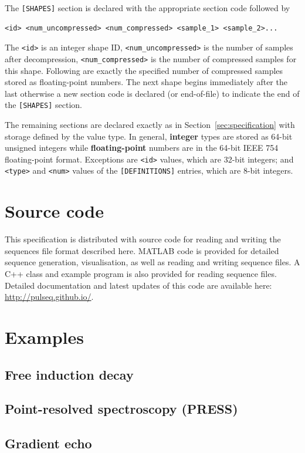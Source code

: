 \documentclass{article}
\begin{document}
The \verb.[SHAPES]. section is declared with the appropriate section code followed by
\begin{lstlisting}
<id> <num_uncompressed> <num_compressed> <sample_1> <sample_2>...
\end{lstlisting}
The \verb.<id>. is an integer shape ID, \verb.<num_uncompressed>. is the number of samples after decompression, \verb.<num_compressed>. is the number of compressed samples for this shape. Following are exactly the specified number of compressed samples stored as floating-point numbers. The next shape begins immediately after the last otherwise a new section code is declared (or end-of-file) to indicate the end of the \verb.[SHAPES]. section.

The remaining sections are declared exactly as in Section~\ref{sec:specification} with storage defined by the value type. In general, \textbf{integer} types are stored as 64-bit unsigned integers while \textbf{floating-point} numbers are in the 64-bit IEEE 754 floating-point format. Exceptions are \verb.<id>. values, which are 32-bit integers; and \verb.<type>. and \verb.<num>. values of the \verb.[DEFINITIONS]. entries, which are 8-bit integers.

\section{Source code}
This specification is distributed with source code for reading and writing the sequences file format described here. MATLAB code is provided for detailed sequence generation, visualisation, as well as reading and writing sequence files. A C++ class and example program is also provided for reading sequence files. Detailed documentation and latest updates of this code are available here: \url{http://pulseq.github.io/}.

\newpage
\section{Examples}

\subsection{Free induction decay}



\subsection{Point-resolved spectroscopy (PRESS)}



\subsection{Gradient echo}


\end{document}
